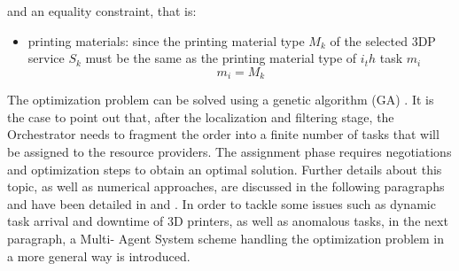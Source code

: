 and an equality constraint, that is:
\begin{itemize}
    \item printing materials: since the printing material type $M_k$ of the selected 3DP service $S_k$ must be the same as the printing material type of $i_th$ task $m_i$ \begin{equation}\label{eq:6}m_i = M_k \end{equation}
\end{itemize}
The optimization problem can be solved using a genetic algorithm (GA) \parencite{zhou_multi-task_2018}. It is the case to point out that, after the localization and filtering stage, the Orchestrator needs to fragment the order into a finite number of tasks that will be assigned to the resource providers. The assignment phase requires negotiations and optimization steps to obtain an optimal solution. Further details about this topic, as well as numerical approaches, are discussed in
the following paragraphs and have been detailed in \textcite{de_falco_negotiating_2017} and \textcite{de_falco_integrating_2019}.
In order to tackle some issues such as dynamic task arrival and downtime of 3D printers, as well as anomalous tasks, in the next paragraph, a Multi- Agent System scheme handling the optimization problem in a more general way is introduced.
